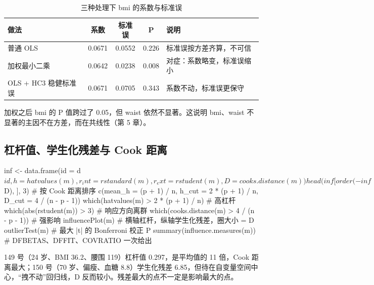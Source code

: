 \begin{table}[htbp]
\centering\small
\caption{三种处理下 bmi 的系数与标准误}
\begin{tabular}{@{}lS[table-format=1.4]S[table-format=1.4]S[table-format=1.3]l@{}}
\toprule
做法 & {系数} & {标准误} & {P} & 说明\\
\midrule
普通 OLS & 0.0671 & 0.0552 & 0.226 & 标准误按方差齐算，不可信\\
加权最小二乘 & 0.0642 & 0.0238 & 0.008 & 对症：系数略变，标准误缩小\\
OLS + HC3 稳健标准误 & 0.0671 & 0.0705 & 0.343 & 系数不动，标准误更保守\\
\bottomrule
\end{tabular}
\end{table}
加权之后 bmi 的 P 值跨过了 0.05，但 waist 依然不显著。这说明 bmi、waist 不显著的主因不在方差，而在共线性（第 5 章）。

\subsection{杠杆值、学生化残差与 Cook 距离}
\label{sec:influence}
\begin{RCode}[R · 影响度量]
inf <- data.frame(id = d$id, h = hatvalues(m), r_int = rstandard(m),
                  r_ext = rstudent(m), D = cooks.distance(m))
head(inf[order(-inf$D), ], 3)                    # 按 Cook 距离排序
c(mean_h = (p + 1) / n, h_cut = 2 * (p + 1) / n, D_cut = 4 / (n - p - 1))
which(hatvalues(m) > 2 * (p + 1) / n)            # 高杠杆
which(abs(rstudent(m)) > 3)                      # 响应方向离群
which(cooks.distance(m) > 4 / (n - p - 1))       # 强影响
influencePlot(m)                                 # 横轴杠杆，纵轴学生化残差，圈大小 = D
outlierTest(m)                                   # 最大 |t| 的 Bonferroni 校正 P
summary(influence.measures(m))                   # DFBETAS、DFFIT、COVRATIO 一次给出
\end{RCode}
149 号（24 岁、BMI 36.2、腰围 119）杠杆值 0.297，是平均值的 11 倍，Cook 距离最大；150 号（70 岁、偏瘦、血糖 8.8）学生化残差 6.85，但待在自变量空间中心，“拽不动”回归线，D 反而较小。残差最大的点不一定是影响最大的点。

